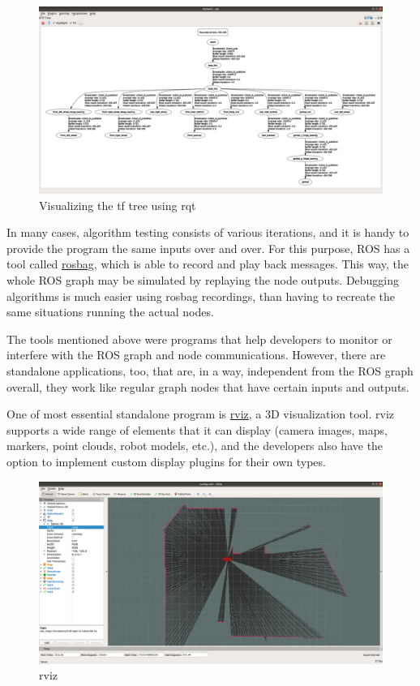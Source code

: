 \begin{figure}[!ht]
	\centering
	\includegraphics[width=\textwidth]{figures/raw/rqt.png}
	\caption{Visualizing the tf tree using rqt}
	\label{rqt_graph}
\end{figure}

In many cases, algorithm testing consists of various iterations, and it is handy to provide the program the same inputs over and over. For this purpose, ROS has a tool called \href{http://wiki.ros.org/rosbag}{rosbag}, which is able to record and play back messages. This way, the whole ROS graph may be simulated by replaying the node outputs. Debugging algorithms is much easier using rosbag recordings, than having to recreate the same situations running the actual nodes.

The tools mentioned above were programs that help developers to monitor or interfere with the ROS graph and node communications. However, there are standalone applications, too, that are, in a way, independent from the ROS graph overall, they work like regular graph nodes that have certain inputs and outputs.

One of most essential standalone program is \href{http://wiki.ros.org/rviz}{rviz}, a 3D visualization tool. rviz supports a wide range of elements that it can display (camera images, maps, markers, point clouds, robot models, etc.), and the developers also have the option to implement custom display plugins for their own types.

\begin{figure}[!ht]
	\centering
	\includegraphics[width=\textwidth]{figures/raw/rviz.png}
	\caption{rviz}
	\label{rviz}
\end{figure}


